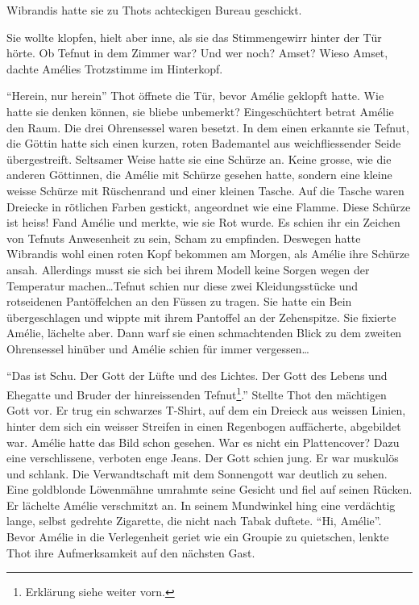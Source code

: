 \documentclass[11pt,titlepage,a5paper]{book}
\begin{document}
Wibrandis hatte sie zu Thots achteckigen Bureau geschickt.

Sie wollte klopfen, hielt aber inne, als sie das Stimmengewirr hinter der Tür hörte. Ob Tefnut in dem Zimmer war? Und wer noch? Amset? Wieso Amset, dachte Amélies Trotzstimme im Hinterkopf.

"`Herein, nur herein"' Thot öffnete die Tür, bevor Amélie geklopft hatte. Wie hatte sie denken können, sie bliebe unbemerkt? Eingeschüchtert betrat Amélie den Raum. Die drei Ohrensessel waren besetzt. In dem einen erkannte sie Tefnut, die Göttin hatte sich einen kurzen, roten Bademantel aus weichfliessender Seide übergestreift. Seltsamer Weise hatte sie eine Schürze an. Keine grosse, wie die anderen Göttinnen, die Amélie mit Schürze gesehen hatte, sondern eine kleine weisse Schürze mit Rüschenrand und einer kleinen Tasche. Auf die Tasche waren Dreiecke in rötlichen Farben gestickt, angeordnet wie eine Flamme. Diese Schürze ist heiss! Fand Amélie und merkte, wie sie Rot wurde. Es schien ihr ein Zeichen von Tefnuts Anwesenheit zu sein, Scham zu empfinden. Deswegen hatte Wibrandis wohl einen roten Kopf bekommen am Morgen, als Amélie ihre Schürze ansah. Allerdings musst sie sich bei ihrem Modell keine Sorgen wegen der Temperatur machen\dots Tefnut schien nur diese zwei Kleidungsstücke und rotseidenen Pantöffelchen an den Füssen zu tragen.  Sie hatte ein Bein übergeschlagen und wippte mit ihrem Pantoffel an der Zehenspitze. Sie fixierte Amélie, lächelte aber. Dann warf sie einen schmachtenden Blick zu dem zweiten Ohrensessel hinüber und Amélie schien für immer vergessen\dots

"`Das ist Schu. Der Gott der Lüfte und des Lichtes. Der Gott des Lebens und Ehegatte und Bruder der hinreissenden Tefnut\footnote{Erklärung siehe weiter vorn.}."' Stellte Thot den mächtigen  Gott vor. Er trug ein schwarzes T-Shirt, auf dem ein Dreieck aus weissen Linien, hinter dem sich ein weisser Streifen in einen Regenbogen auffächerte, abgebildet war. Amélie hatte das Bild schon gesehen. War es nicht ein Plattencover? Dazu eine verschlissene, verboten enge Jeans. Der Gott schien jung. Er war muskulös und schlank. Die Verwandtschaft mit dem Sonnengott war deutlich zu sehen. Eine goldblonde Löwenmähne umrahmte seine Gesicht und fiel auf seinen Rücken. Er lächelte Amélie verschmitzt an. In seinem Mundwinkel hing eine verdächtig lange, selbst gedrehte Zigarette, die nicht nach Tabak duftete. "`Hi, Amélie"'. Bevor Amélie in die Verlegenheit geriet wie ein Groupie zu quietschen, lenkte Thot ihre Aufmerksamkeit auf den nächsten Gast. 
\end{document}
